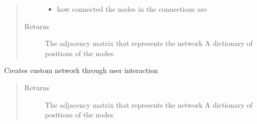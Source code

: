 \documentclass[letterpaper,10pt,english]{sphinxmanual}
\begin{document}
\begin{fulllineitems}
\begin{quote}
\begin{description}
\begin{itemize}
\item {}
\sphinxAtStartPar
{} \textendash{} how connected the nodes in the connections are

\end{itemize}

\item[{Returns}] \leavevmode
\sphinxAtStartPar
The adjacency matrix that represents the network
A dictionary of positions of the nodes

\end{description}\end{quote}

\end{fulllineitems}


\begin{fulllineitems}
\label{\detokenize{source/yawning_titan.envs.generic.helpers:yawning_titan.envs.generic.helpers.network_creator.custom_network}}
\sphinxAtStartPar
Creates custom network through user interaction
\begin{quote}\begin{description}
\item[{Returns}] \leavevmode
\sphinxAtStartPar
The adjacency matrix that represents the network
A dictionary of positions of the nodes

\end{description}\end{quote}

\end{fulllineitems}
\end{document}
